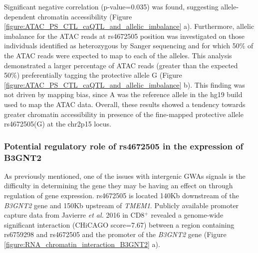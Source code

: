 Significant negative correlation (p-value=0.035) was found, suggesting allele-dependent chromatin accessibility (Figure \ref{figure:ATAC_PS_CTL_caQTL_and_allelic_imbalance} a). Furthermore, allelic imbalance for the ATAC reads at rs4672505 position was investigated on those individuals identified as heterozygous by Sanger sequencing and for which 50\% of the ATAC reads were expected to map to each of the alleles. This analysis demonstrated a larger percentage of ATAC reads (greater than the expected 50\%) preferentially tagging the protective allele G (Figure \ref{figure:ATAC_PS_CTL_caQTL_and_allelic_imbalance} b). This finding was not driven by mapping bias, since A was the reference allele in the hg19 build used to map the ATAC data. Overall, these results showed a tendency towards greater chromatin accessibility in presence of the fine-mapped protective allele rs4672505(G) at the chr2p15 locus.
 

\subsubsection{Potential regulatory role of rs4672505 in the expression of B3GNT2}
As previously mentioned, one of the issues with intergenic GWAs signals is the difficulty in determining the gene they may be having an effect on through regulation of gene expression. rs4672505 is located 140Kb downstream of the \textit{B3GNT2} gene and 150Kb upstream of \textit{TMEM1}. Publicly available promoter capture data from Javierre \textit{et al.} 2016 in CD8$^+$ revealed a genome-wide significant interaction (CHiCAGO score=7.67) between a region containing rs6759298 and rs4672505 and the promoter of the \textit{B3GNT2} gene (Figure \ref{figure:RNA_chromatin_interaction_B3GNT2} a). 

